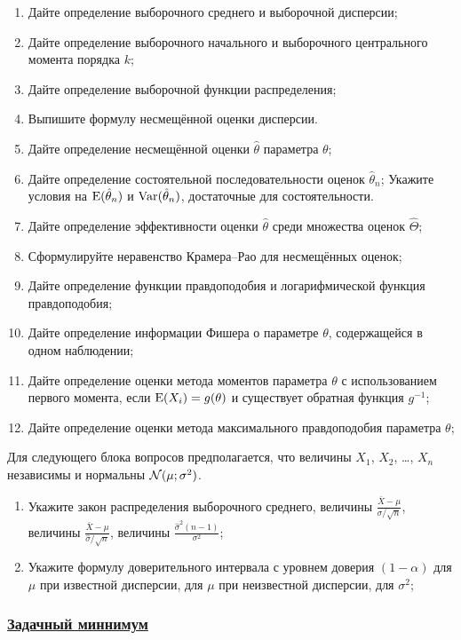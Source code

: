 \begin{enumerate}[resume]
	\item Дайте определение выборочного среднего и выборочной дисперсии;
	\item Дайте определение выборочного начального и выборочного центрального момента порядка $k$;
	\item Дайте определение выборочной функции распределения;
	\item Выпишите формулу несмещённой оценки дисперсии. 
	\item Дайте определение несмещённой оценки $\hat \theta$ параметра $\theta$;
	\item Дайте определение состоятельной последовательности оценок $\hat \theta_n$; 
	Укажите условия на $\operatorname{E}(\hat\theta_n)$ и $\operatorname{Var}(\hat\theta_n)$, достаточные для состоятельности.
	\item Дайте определение эффективности оценки $\hat \theta$ среди множества оценок $\hat \Theta$;  
	\item Сформулируйте неравенство Крамера–Рао для несмещённых оценок;
	\item Дайте определение функции правдоподобия и логарифмической функция правдоподобия;
	\item Дайте определение информации Фишера о параметре $\theta$, содержащейся в одном наблюдении;
	\item Дайте определение оценки метода моментов параметра $\theta$ с использованием первого момента,
	если $\operatorname{E}(X_i)=g(\theta)$ и существует обратная функция $g^{-1}$;
  \item Дайте определение оценки метода максимального правдоподобия параметра $\theta$;
\end{enumerate}


Для следующего блока вопросов предполагается, что величины $X_1$, $X_2$, \ldots, $X_n$ независимы и нормальны $\mathcal{N}(\mu;\sigma^2)$.

\begin{enumerate}[resume]
  \item Укажите закон распределения выборочного среднего,
	величины $\frac{\bar X - \mu}{\sigma/\sqrt{n}}$,
	величины $\frac{\bar X - \mu}{\hat\sigma/\sqrt{n}}$,
	величины $\frac{\hat\sigma^2(n-1)}{\sigma^2}$;
  \item Укажите формулу доверительного интервала с уровнем доверия
	$(1-\alpha)$ для $\mu$ при известной дисперсии,
	для $\mu$ при неизвестной дисперсии, для $\sigma^2$;
\end{enumerate}


\newpage
\subsubsection*{\hyperref[sec:sol_minimum_kr_03]{Задачный миннимум}}
\label{sec:minimum_kr_03}

